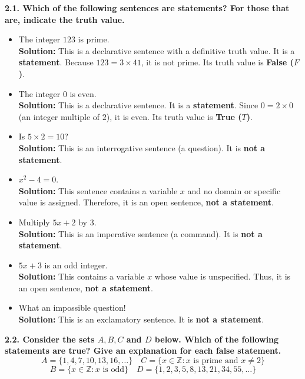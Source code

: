 \documentclass[11pt]{article}
\begin{document}
\textbf{2.1. Which of the following sentences are statements? For those that are, indicate the truth value.}
\begin{itemize}
    \item[(a)] The integer $123$ is prime. \\
    \textbf{Solution:} This is a declarative sentence with a definitive truth value. It is a \textbf{statement}. Because $123 = 3 \times 41$, it is not prime. Its truth value is \textbf{False ($F$)}.
    
    \item[(b)] The integer $0$ is even. \\
    \textbf{Solution:} This is a declarative sentence. It is a \textbf{statement}. Since $0 = 2 \times 0$ (an integer multiple of $2$), it is even. Its truth value is \textbf{True ($T$)}.
    
    \item[(c)] Is $5 \times 2 = 10$? \\
    \textbf{Solution:} This is an interrogative sentence (a question). It is \textbf{not a statement}.
    
    \item[(d)] $x^2 - 4 = 0$. \\
    \textbf{Solution:} This sentence contains a variable $x$ and no domain or specific value is assigned. Therefore, it is an open sentence, \textbf{not a statement}.
    
    \item[(e)] Multiply $5x + 2$ by $3$. \\
    \textbf{Solution:} This is an imperative sentence (a command). It is \textbf{not a statement}.
    
    \item[(f)] $5x + 3$ is an odd integer. \\
    \textbf{Solution:} This contains a variable $x$ whose value is unspecified. Thus, it is an open sentence, \textbf{not a statement}.
    
    \item[(g)] What an impossible question! \\
    \textbf{Solution:} This is an exclamatory sentence. It is \textbf{not a statement}.
\end{itemize}

\vspace{0.5cm}
\textbf{2.2. Consider the sets $A, B, C$ and $D$ below. Which of the following statements are true? Give an explanation for each false statement.}
\[ A = \{1, 4, 7, 10, 13, 16, \dots\} \quad C = \{x \in \mathbb{Z} : x \text{ is prime and } x \neq 2\} \]
\[ B = \{x \in \mathbb{Z} : x \text{ is odd}\} \quad D = \{1, 2, 3, 5, 8, 13, 21, 34, 55, \dots\} \]
\end{document}
